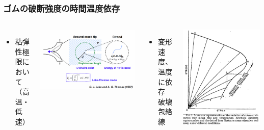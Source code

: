 \documentclass[12pt, dvipdfmx]{beamer}
\begin{document}
\begin{frame}
    \frametitle{ゴムの破断強度の時間温度依存}
    
    
    \begin{columns}[T, totalwidth=\textwidth]
    \begin{itemize}
		\item 粘弾性極限において\\
		（高温・低速）
	\end{itemize}
    \includegraphics[width=\textwidth]{Lake_Thomas.png}
    
    \begin{itemize}
		\item 変形速度、温度に依存\\
		破壊包絡線
	\end{itemize}
	\begin{center}
		\includegraphics[width=.48\textwidth]{Time_Temp_3.png}


\end{center}
\end{columns}
\end{frame}
\end{document}
